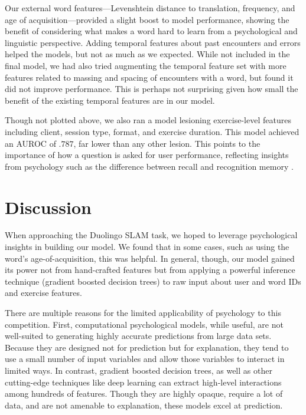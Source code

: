 \documentclass[11pt,a4paper]{article}
\begin{document}
Our external word features---Levenshtein distance to translation, frequency, and
age of acquisition---provided a slight boost to model performance, showing the
benefit of considering what makes a word hard to learn from a psychological and
linguistic perspective. Adding temporal features about past encounters and
errors helped the models, but not as much as we expected. While not included in
the final model, we had also tried augmenting the temporal feature set with more
features related to massing and spacing of encounters with a word, but found it
did not improve performance. This is perhaps not surprising given how small the
benefit of the existing temporal features are in our model.

Though not plotted above, we also ran a model lesioning exercise-level features
including client, session type, format, and exercise duration. This model
achieved an AUROC of $.787$, far lower than any other lesion. This points to the
importance of how a question is asked for user performance, reflecting insights
from psychology such as the difference between recall and recognition memory
\cite{yonelinas2002nature}.

\section{Discussion}

When approaching the Duolingo SLAM task, we hoped to leverage psychological
insights in building our model. We found that in some cases, such as using the
word's age-of-acquisition, this was helpful. In general, though, our model gained its
power not from hand-crafted features but from applying a powerful inference
technique (gradient boosted decision trees) to raw input about user and word IDs and
exercise features.

There are multiple reasons for the limited applicability of psychology to this
competition. First, computational psychological models, while useful, are not
well-suited to generating highly accurate predictions from large data sets.
Because they are designed not for prediction but for explanation, they tend to
use a small number of input variables and allow those variables to interact
in limited ways. In contrast, gradient boosted decision trees, as well as other
cutting-edge techniques like deep learning can extract high-level
interactions among hundreds of features. Though they are highly opaque, require
a lot of data, and are not amenable to explanation, these models excel at prediction.
\end{document}

